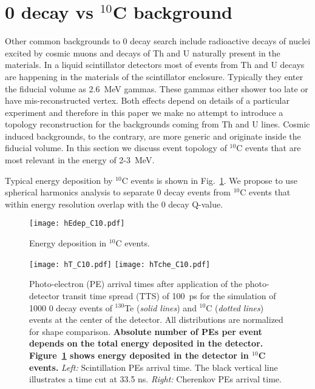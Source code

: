 \section{0{\nbb} decay vs $^{10}$C background}

Other common backgrounds to 0{\nbb} decay search include radioactive
decays of nuclei excited by cosmic muons and decays of Th and U
naturally present in the materials. In a liquid scintillator detectors
most of events from Th and U decays are happening in the materials of
the scintillator enclosure. Typically they enter the fiducial volume
as 2.6~MeV gammas. These gammas either shower too late or have
mis-reconstructed vertex. Both effects depend on details of a
particular experiment and therefore in this paper we make no attempt
to introduce a topology reconstruction for the backgrounds coming from
Th and U lines. Cosmic induced backgrounds, to the contrary, are more
generic and originate inside the fiducial volume. In this section we
discuss event topology of $^{10}$C events that are most relevant in the
energy of 2-3~MeV.

Typical energy deposition by $^{10}$C events is shown in
Fig.~\ref{fig:Edep_C10}. We propose to use spherical harmonics
analysis to separate 0{\nbb} decay events from $^{10}$C events that
within energy resolution overlap with the 0{\nbb} decay Q-value.



\begin{figure}[h]
  \centering
  \texttt{[image: hEdep\_C10.pdf]}
  \caption{Energy deposition in $^{10}$C events.}
  \label{fig:Edep_C10}
\end{figure}

\begin{figure}[h]
  \centering
  \texttt{[image: hT\_C10.pdf]}
  \texttt{[image: hTche\_C10.pdf]}
  \caption{Photo-electron (PE) arrival times after application of the
    photo-detector transit time spread (TTS) of 100~ps for the
    simulation of 1000 0{\nbb} decay events of $^{130}$Te (\emph{solid
      lines}) and $^{10}$C (\emph{dotted lines}) events at the center
    of the detector. All distributions are normalized for shape
    comparison. {\bf Absolute number of PEs per event depends on the
      total energy deposited in the
      detector. Figure~\ref{fig:Edep_C10} shows energy deposited in
      the detector in $^{10}$C events.} \emph{Left:} Scintillation PEs
    arrival time. The black vertical line illustrates a time cut at
    33.5 ns. \emph{Right:} Cherenkov PEs arrival time.}
\label{fig:Arrival_time_C10}
\end{figure}

